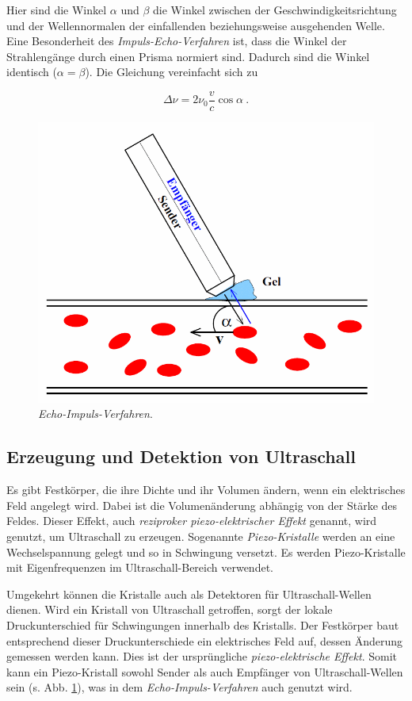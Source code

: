 Hier sind die Winkel $\alpha$ und $\beta$ die Winkel zwischen der Geschwindigkeitsrichtung und der Wellennormalen der einfallenden beziehungsweise ausgehenden Welle.
Eine Besonderheit des \textit{Impuls-Echo-Verfahren} ist, dass die Winkel der Strahlengänge durch einen Prisma normiert sind. Dadurch sind die Winkel identisch ($\alpha = \beta$).
Die Gleichung vereinfacht sich zu 

\begin{equation}
    \Delta \nu = 2 \nu_0 \frac{v}{c} \cos{\alpha} \:.
\end{equation}

\begin{figure}
    \centering
    \includegraphics[width=.95\textwidth]{media/echo-impuls-verfahren.png}
    \caption{\textit{Echo-Impuls-Verfahren}.}
    \label{fig:eiv}
\end{figure}

\subsection{Erzeugung und Detektion von Ultraschall}
Es gibt Festkörper, die ihre Dichte und ihr Volumen ändern, wenn ein elektrisches Feld angelegt wird. Dabei ist die Volumenänderung abhängig von der Stärke des Feldes.
Dieser Effekt, auch \textit{reziproker piezo-elektrischer Effekt} genannt, wird genutzt, um Ultraschall zu erzeugen. Sogenannte \textit{Piezo-Kristalle} werden an eine Wechselspannung gelegt und
so in Schwingung versetzt. Es werden Piezo-Kristalle mit Eigenfrequenzen im Ultraschall-Bereich verwendet.

Umgekehrt können die Kristalle auch als Detektoren für Ultraschall-Wellen dienen. Wird ein Kristall von Ultraschall getroffen, sorgt der lokale Druckunterschied für Schwingungen innerhalb
des Kristalls. Der Festkörper baut entsprechend dieser Druckunterschiede ein elektrisches Feld auf, dessen Änderung gemessen werden kann. Dies ist der ursprüngliche \textit{piezo-elektrische Effekt}.
Somit kann ein Piezo-Kristall sowohl Sender als auch Empfänger von Ultraschall-Wellen sein (s. Abb. \ref{fig:eiv}), was in dem \textit{Echo-Impuls-Verfahren} auch genutzt wird.